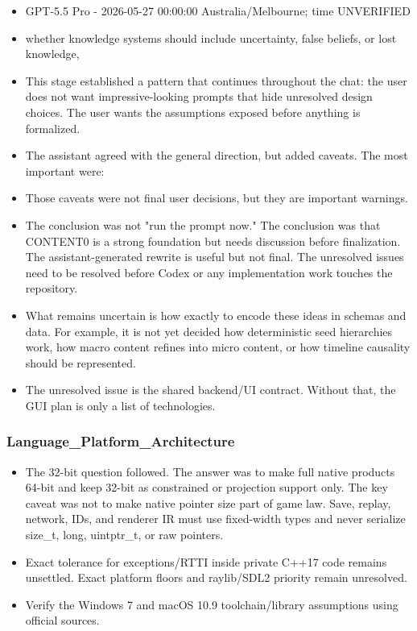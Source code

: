 \documentclass[11pt,a4paper]{report}
\begin{document}
\begin{itemize}
\item GPT-5.5 Pro - 2026-05-27 00:00:00 Australia/Melbourne; time UNVERIFIED
\item whether knowledge systems should include uncertainty, false beliefs, or lost knowledge,
\item This stage established a pattern that continues throughout the chat: the user does not want impressive-looking prompts that hide unresolved design choices. The user wants the assumptions exposed before anything is formalized.
\item The assistant agreed with the general direction, but added caveats. The most important were:
\item Those caveats were not final user decisions, but they are important warnings.
\item The conclusion was not "run the prompt now." The conclusion was that CONTENT0 is a strong foundation but needs discussion before finalization. The assistant-generated rewrite is useful but not final. The unresolved issues need to be resolved before Codex or any implementation work touches the repository.
\item What remains uncertain is how exactly to encode these ideas in schemas and data. For example, it is not yet decided how deterministic seed hierarchies work, how macro content refines into micro content, or how timeline causality should be represented.
\item The unresolved issue is the shared backend/UI contract. Without that, the GUI plan is only a list of technologies.
\end{itemize}

\subsubsection{Language\_Platform\_Architecture}

\begin{itemize}
\item The 32-bit question followed. The answer was to make full native products 64-bit and keep 32-bit as constrained or projection support only. The key caveat was not to make native pointer size part of game law. Save, replay, network, IDs, and renderer IR must use fixed-width types and never serialize size\_t, long, uintptr\_t, or raw pointers.
\item Exact tolerance for exceptions/RTTI inside private C++17 code remains unsettled. Exact platform floors and raylib/SDL2 priority remain unresolved.
\item Verify the Windows 7 and macOS 10.9 toolchain/library assumptions using official sources.
\end{itemize}
\end{document}
